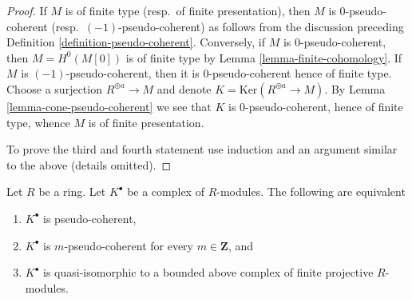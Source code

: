 \begin{proof}
If $M$ is of finite type (resp.\ of finite presentation), then $M$
is $0$-pseudo-coherent (resp.\ $(-1)$-pseudo-coherent) as follows from the
discussion preceding
Definition \ref{definition-pseudo-coherent}.
Conversely, if $M$ is $0$-pseudo-coherent, then $M = H^0(M[0])$
is of finite type by
Lemma \ref{lemma-finite-cohomology}.
If $M$ is $(-1)$-pseudo-coherent, then it is $0$-pseudo-coherent hence
of finite type. Choose a surjection $R^{\oplus a} \to M$ and denote
$K = \text{Ker}(R^{\oplus a} \to M)$. By
Lemma \ref{lemma-cone-pseudo-coherent}
we see that $K$ is $0$-pseudo-coherent, hence of finite type, whence
$M$ is of finite presentation.

\medskip\noindent
To prove the third and fourth statement use
induction and an argument similar to the above (details omitted).
\end{proof}

\begin{lemma}
\label{lemma-pseudo-coherent}
Let $R$ be a ring. Let $K^\bullet$ be a complex of $R$-modules.
The following are equivalent
\begin{enumerate}
\item $K^\bullet$ is pseudo-coherent,
\item $K^\bullet$ is $m$-pseudo-coherent for every $m \in \mathbf{Z}$, and
\item $K^\bullet$ is quasi-isomorphic to a bounded above complex of finite
projective $R$-modules.
\end{enumerate}
\end{lemma}

